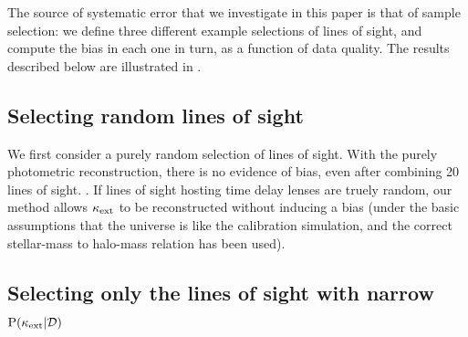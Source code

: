 \documentclass[useAMS,usenatbib,a4paper]{mn2e}
\begin{document}

The source of systematic error that we investigate in this paper  is that of
sample selection: we define three different example selections of lines of
sight, and compute the bias   in each one in turn, as a function of data quality. The results
described below are illustrated in .



\subsection{Selecting random lines of sight}
\label{sec:bias:random}

We first consider a purely random selection of lines of sight. With the purely
photometric reconstruction, there is no evidence of bias, even after combining
20 lines of sight. . If lines of sight hosting time delay lenses are truely random, 
our method allows $\kappa_{\rm ext}$ to be reconstructed without inducing a bias (under
the basic assumptions that the universe is like the calibration simulation,
and the correct stellar-mass to halo-mass relation has been used). 



\subsection{Selecting only the lines of sight with narrow ${\rm P}(\kappa_{\rm ext}|{\mathcal{D}})$}
\label{sec:bias:tightPDF}
\end{document}
